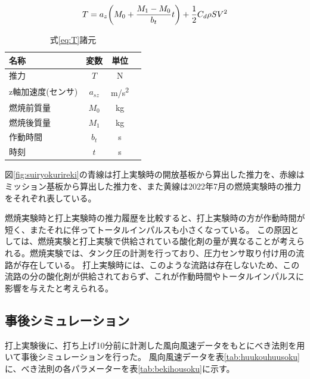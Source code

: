 \documentclass[a4paper,11pt,uplatex]{jsarticle}
\begin{document}
\begin{equation}
	T = a_z\qty(M_0 + \frac{M_1-M_0}{b_t}t)+\frac{1}{2}C_d \rho S V^2
	\label{eq:T}
\end{equation}

\begin{table}[H]
	\centering
	\caption{式\eqref{eq:T}諸元}
	\label{tab:eqshogen}
	\begin{tabular}{lccr}
		\toprule
		名称         & 変数       & 単位         \\
		\midrule
		推力         & $T$      & \si{N}     \\
		z軸加速度(センサ) & $a_{sz}$ & \si{m/s^2} \\
		燃焼前質量      & $M_0$    & \si{kg}    \\
		燃焼後質量      & $M_1$    & \si{kg}    \\
		作動時間       & $b_t$    & \si{s}     \\
		時刻         & $t$      & \si{s}     \\
		\bottomrule
	\end{tabular}
\end{table}

図\ref{fig:suiryokurireki}の青線は打上実験時の開放基板から算出した推力を、赤線はミッション基板から算出した推力を、また黄線は2022年7月の燃焼実験時の推力をそれぞれ表している。

燃焼実験時と打上実験時の推力履歴を比較すると、打上実験時の方が作動時間が短く、またそれに伴ってトータルインパルスも小さくなっている。
この原因としては、燃焼実験と打上実験で供給されている酸化剤の量が異なることが考えられる。燃焼実験では、タンク圧の計測を行っており、圧力センサ取り付け用の流路が存在している。
打上実験時には、このような流路は存在しないため、この流路の分の酸化剤が供給されておらず、これが作動時間やトータルインパルスに影響を与えたと考えられる。

\subsection{事後シミュレーション}
打上実験後に、打ち上げ10分前に計測した風向風速データをもとにべき法則を用いて事後シミュレーションを行った。
風向風速データを表\ref{tab:huukouhuusoku}に、べき法則の各パラメーターを表\ref{tab:bekihousoku}に示す。
\end{document}
